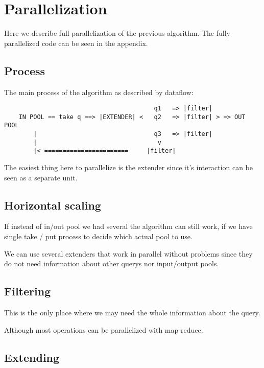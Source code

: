 \chapter{Parallelization}

Here we describe full parallelization of the previous 
algorithm. The fully parallelized code can be seen in the appendix.

\section{Process}

The main process of the algorithm as described by dataflow:

\begin{verbatim}
									     q1   => |filter|
	IN POOL == take q ==> |EXTENDER| <   q2   => |filter| > => OUT POOL
		|								 q3   => |filter|
		|							      v
		|< =======================     |filter|
\end{verbatim}


The easiest thing here to parallelize is the extender since it's interaction
can be seen as a separate unit.

\section{Horizontal scaling}

If instead of in/out pool we had several the algorithm can still work, if we
have single take / put process to decide which actual pool to use.

We can use several extenders that work in parallel without problems since they do not need information about other querys nor input/output pools.


\section{Filtering}

This is the only place where we may need the whole information about the query.

Although most operations can be parallelized with map reduce.

\section{Extending}

